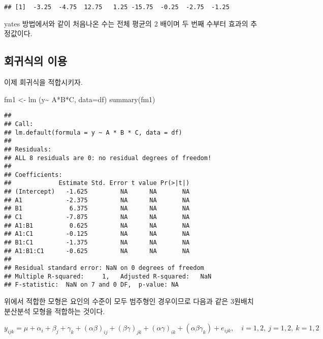 \documentclass[
]{book}
\newenvironment{Shaded}{\begin{snugshade}}{\end{snugshade}}
\newcommand{\AttributeTok}[1]{\textcolor[rgb]{0.77,0.63,0.00}{#1}}
\newcommand{\FunctionTok}[1]{\textcolor[rgb]{0.00,0.00,0.00}{#1}}
\newcommand{\NormalTok}[1]{#1}
\newcommand{\OtherTok}[1]{\textcolor[rgb]{0.56,0.35,0.01}{#1}}
\newcommand{\SpecialCharTok}[1]{\textcolor[rgb]{0.00,0.00,0.00}{#1}}
\begin{document}
\begin{verbatim}
## [1]  -3.25  -4.75  12.75   1.25 -15.75  -0.25  -2.75  -1.25
\end{verbatim}

yates 방법에서와 같이 처음나온 수는 전체 평균의 2 배이며 두 번째 수부터 효과의 추정값이다.

\hypertarget{uxd68cuxadc0uxc2dduxc758-uxc774uxc6a9}{%
\subsection{회귀식의 이용}\label{uxd68cuxadc0uxc2dduxc758-uxc774uxc6a9}}

이제 회귀식을 적합시키자.

\begin{Shaded}
\begin{Highlighting}[]
\NormalTok{fm1 }\OtherTok{\textless{}{-}} \FunctionTok{lm}\NormalTok{ (y}\SpecialCharTok{\textasciitilde{}}\NormalTok{ A}\SpecialCharTok{*}\NormalTok{B}\SpecialCharTok{*}\NormalTok{C, }\AttributeTok{data=}\NormalTok{df) }
\FunctionTok{summary}\NormalTok{(fm1)}
\end{Highlighting}
\end{Shaded}

\begin{verbatim}
## 
## Call:
## lm.default(formula = y ~ A * B * C, data = df)
## 
## Residuals:
## ALL 8 residuals are 0: no residual degrees of freedom!
## 
## Coefficients:
##             Estimate Std. Error t value Pr(>|t|)
## (Intercept)   -1.625         NA      NA       NA
## A1            -2.375         NA      NA       NA
## B1             6.375         NA      NA       NA
## C1            -7.875         NA      NA       NA
## A1:B1          0.625         NA      NA       NA
## A1:C1         -0.125         NA      NA       NA
## B1:C1         -1.375         NA      NA       NA
## A1:B1:C1      -0.625         NA      NA       NA
## 
## Residual standard error: NaN on 0 degrees of freedom
## Multiple R-squared:     1,   Adjusted R-squared:   NaN 
## F-statistic:  NaN on 7 and 0 DF,  p-value: NA
\end{verbatim}

위에서 적합한 모형은 요인의 수준이 모두 범주형인 경우이므로 다음과 같은 3원배치 분산분석 모형을 적합하는 것이다.

\begin{equation}
y_{ijk} = \mu + \alpha_i + \beta_j + \gamma_k + (\alpha \beta)_{ij} +(\beta \gamma)_{jk} + (\alpha \gamma )_{ik} + (\alpha \beta \gamma_k) + e_{ijk},\quad i=1,2,~j=1,2,~k=1,2 
\label{eq:satmodel}
\end{equation}
\end{document}
